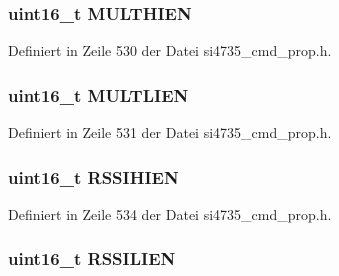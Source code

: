 \subsubsection[{M\+U\+L\+T\+H\+I\+E\+N}]{\setlength{\rightskip}{0pt plus 5cm}uint16\+\_\+t M\+U\+L\+T\+H\+I\+E\+N}\label{unionfm__rsq__int__source_a55c9ae36251cd957e3521ababda535c1}


Definiert in Zeile 530 der Datei si4735\+\_\+cmd\+\_\+prop.\+h.

\hypertarget{unionfm__rsq__int__source_a0100608b514d71a21fb69cd79e9dcd10}{}
\subsubsection[{M\+U\+L\+T\+L\+I\+E\+N}]{\setlength{\rightskip}{0pt plus 5cm}uint16\+\_\+t M\+U\+L\+T\+L\+I\+E\+N}\label{unionfm__rsq__int__source_a0100608b514d71a21fb69cd79e9dcd10}


Definiert in Zeile 531 der Datei si4735\+\_\+cmd\+\_\+prop.\+h.

\hypertarget{unionfm__rsq__int__source_a64ed8e38df22eeee47a0b56e90c538bc}{}
\subsubsection[{R\+S\+S\+I\+H\+I\+E\+N}]{\setlength{\rightskip}{0pt plus 5cm}uint16\+\_\+t R\+S\+S\+I\+H\+I\+E\+N}\label{unionfm__rsq__int__source_a64ed8e38df22eeee47a0b56e90c538bc}


Definiert in Zeile 534 der Datei si4735\+\_\+cmd\+\_\+prop.\+h.

\hypertarget{unionfm__rsq__int__source_a1b6a2a337633a44012ed35381237e67f}{}
\subsubsection[{R\+S\+S\+I\+L\+I\+E\+N}]{\setlength{\rightskip}{0pt plus 5cm}uint16\+\_\+t R\+S\+S\+I\+L\+I\+E\+N}\label{unionfm__rsq__int__source_a1b6a2a337633a44012ed35381237e67f}


